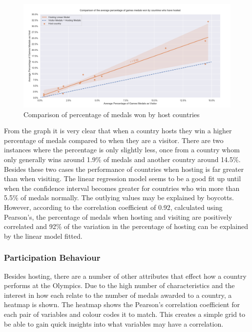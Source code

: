 \documentclass[a4 paper, 12pt]{article}
\begin{document}
        \begin{figure} [H]
            \centering
            \includegraphics[width=\textwidth, frame]
                {./images/graph/countries_host_lmplot.png}      
                \caption{Comparison of percentage of medals won by host countries} 
        \end{figure}
        From the graph it is very clear that when a country hosts they win a higher percentage of medals compared to when they are a visitor. There are two instances where the percentage is only slightly less, once from a country whom only generally wins around 1.9\% of medals and another country around 14.5\%. Besides these two cases the performance of countries when hosting is far greater than when visiting. The linear regression model seems to be a good fit up until when the confidence interval becomes greater for countries who win more than 5.5\% of medals normally. The outlying values may be explained by boycotts. However, according to the correlation coefficient of 0.92, calculated using Pearson's, the percentage of medals when hosting and visiting are positively correlated and 92\% of the variation in the percentage of hosting can be explained by the linear model fitted.

        \subsubsection{Participation Behaviour}
        Besides hosting, there are a number of other attributes that effect how a country performs at the Olympics. Due to the high number of characteristics and the interest in how each relate to the number of medals awarded to a country, a heatmap is shown. The heatmap shows the Pearson's correlation coefficient for each pair of variables and colour codes it to match. This creates a simple grid to be able to gain quick insights into what variables may have a correlation.
\end{document}
